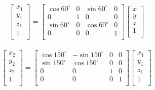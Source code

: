 \documentclass[a4paper,10pt]{jsarticle}
\begin{document}
\begin{eqnarray}
\label{eq:d}
  \left[
    \begin{array}{c}
      x_1\\
      y_1\\
      z_1\\
      1\\
    \end{array}
  \right] =
  \left[
    \begin{array}{cccc}
      \cos{60^\circ} & 0 & \sin{60^\circ} & 0 \\
      0 & 1 & 0 & 0\\
      \sin{60^\circ} & 0 & \cos{60^\circ} & 0\\
      0 & 0 & 0 & 1\\
    \end{array}
  \right]\left[
    \begin{array}{c}
      x\\
      y\\
      z\\
      1\\
    \end{array}
  \right]
\end{eqnarray}

\begin{eqnarray}
\label{eq:e}
  \left[
    \begin{array}{c}
      x_2\\
      y_2\\
      z_2\\
      1\\
    \end{array}
  \right] =
  \left[
    \begin{array}{cccc}
      \cos{150^\circ} & -\sin{150^\circ} & 0 & 0 \\
      \sin{150^\circ} & \cos{150^\circ} & 0 & 0\\
      0 & 0 & 1 & 0\\
      0 & 0 & 0 & 1\\
    \end{array}
  \right]\left[
    \begin{array}{c}
      x_1\\
      y_1\\
      z_1\\
      1\\
    \end{array}
  \right]
\end{eqnarray}
\end{document}
